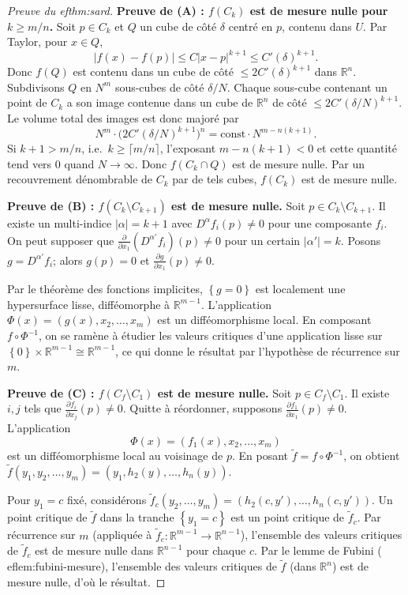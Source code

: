\documentclass[12pt,a4paper,openany]{book}
\theoremstyle{definition}
\theoremstyle{plain}
\theoremstyle{remark}
\newcommand{\R}{\mathbb{R}}
\newcommand{\abs}[1]{\left|#1\right|}
\newcommand{\set}[1]{\left\{#1\right\}}
\begin{document}
\begin{proof}[Preuve du 
ef{thm:sard}]
\medskip\noindent\textbf{Preuve de (A) : $f(C_k)$ est de mesure nulle pour
$k \geq m/n$.}
Soit $p \in C_k$ et $Q$ un cube de côté $\delta$ centré en $p$, contenu dans
$U$. Par Taylor, pour $x \in Q$,
\[
  \abs{f(x) - f(p)} \leq C \abs{x - p}^{k+1} \leq C'(\delta)^{k+1}.
\]
Donc $f(Q)$ est contenu dans un cube de côté $\leq 2C'(\delta)^{k+1}$ dans
$\R^n$. Subdivisons $Q$ en $N^m$ sous-cubes de côté $\delta/N$. Chaque
sous-cube contenant un point de $C_k$ a son image contenue dans un cube de
$\R^n$ de côté $\leq 2C'(\delta/N)^{k+1}$. Le volume total des images est
donc majoré par
\[
  N^m \cdot \bigl(2C'(\delta/N)^{k+1}\bigr)^n
  = \text{const} \cdot N^{m - n(k+1)}.
\]
Si $k + 1 > m/n$, i.e.\ $k \geq \lceil m/n \rceil$, l'exposant $m - n(k+1) < 0$
et cette quantité tend vers $0$ quand $N \to \infty$. Donc $f(C_k \cap Q)$ est
de mesure nulle. Par un recouvrement dénombrable de $C_k$ par de tels cubes,
$f(C_k)$ est de mesure nulle.

\medskip\noindent\textbf{Preuve de (B) : $f(C_k \setminus C_{k+1})$ est de mesure
nulle.}
Soit $p \in C_k \setminus C_{k+1}$. Il existe un multi-indice $\abs{\alpha} = k+1$
avec $D^\alpha f_i(p) \neq 0$ pour une composante $f_i$. On peut supposer que
$\frac{\partial}{\partial x_1}(D^{\alpha'} f_i)(p) \neq 0$ pour un certain
$\abs{\alpha'} = k$. Posons $g = D^{\alpha'} f_i$; alors $g(p) = 0$ et
$\frac{\partial g}{\partial x_1}(p) \neq 0$.

Par le théorème des fonctions implicites, $\set{g = 0}$ est localement une
hypersurface lisse, difféomorphe à $\R^{m-1}$. L'application
$\Phi(x) = (g(x), x_2, \dots, x_m)$ est un difféomorphisme local. En composant
$f \circ \Phi^{-1}$, on se ramène à étudier les valeurs critiques d'une
application lisse sur $\set{0} \times \R^{m-1} \cong \R^{m-1}$, ce qui donne
le résultat par l'hypothèse de récurrence sur $m$.

\medskip\noindent\textbf{Preuve de (C) : $f(C_f \setminus C_1)$ est de mesure nulle.}
Soit $p \in C_f \setminus C_1$. Il existe $i,j$ tels que
$\frac{\partial f_i}{\partial x_j}(p) \neq 0$. Quitte à réordonner, supposons
$\frac{\partial f_1}{\partial x_1}(p) \neq 0$. L'application
\[
  \Phi(x) = (f_1(x), x_2, \dots, x_m)
\]
est un difféomorphisme local au voisinage de $p$. En posant
$\tilde{f} = f \circ \Phi^{-1}$, on obtient $\tilde{f}(y_1, y_2, \dots, y_m)
= (y_1, h_2(y), \dots, h_n(y))$.

Pour $y_1 = c$ fixé, considérons $\tilde{f}_c(y_2, \dots, y_m)
= (h_2(c, y'), \dots, h_n(c, y'))$. Un point critique de $\tilde{f}$
dans la tranche $\set{y_1 = c}$ est un point critique de $\tilde{f}_c$.
Par récurrence sur $m$ (appliquée à $\tilde{f}_c \colon \R^{m-1} \to \R^{n-1}$),
l'ensemble des valeurs critiques de $\tilde{f}_c$ est de mesure nulle dans
$\R^{n-1}$ pour chaque $c$. Par le lemme de Fubini
(
ef{lem:fubini-mesure}), l'ensemble des valeurs critiques de $\tilde{f}$
(dans $\R^n$) est de mesure nulle, d'où le résultat.
\end{proof}
\end{document}

